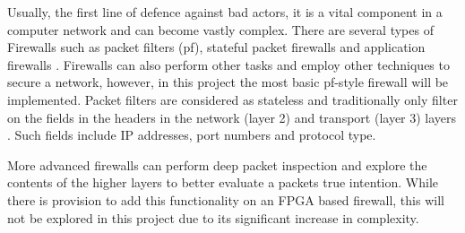 Usually, the first line of defence against bad actors, it is a vital component in a computer network and can become vastly complex. There are several
types of Firewalls such as packet filters (pf), stateful packet firewalls and application firewalls \cite{FirewallsBook}. Firewalls can also perform 
other tasks and employ other techniques to secure a network, however, in this project the most basic pf-style firewall will be implemented. 
Packet filters are considered as stateless and traditionally only filter on the fields in the headers in the network (layer 2) and transport 
(layer 3) layers \cite{FirewallsBook}. Such fields include IP addresses, port numbers and protocol type.

More advanced firewalls can perform deep packet inspection and explore the contents of the higher layers to better evaluate a packets true intention. 
While there is provision to add this functionality on an FPGA based firewall, this will not be explored in this project due to its significant increase 
in complexity. 